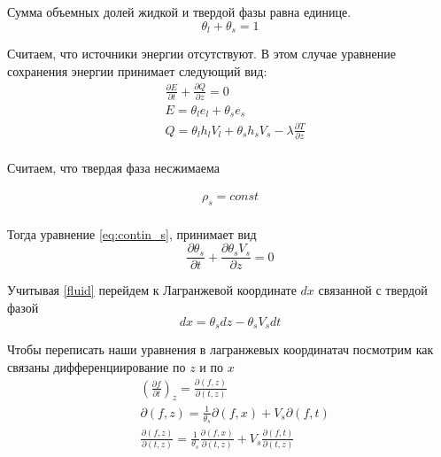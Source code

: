\documentclass[12pt,a4paper]{article}
\newcommand{\pd}[2]{\frac{\partial #1}{\partial #2}}
\begin{document}
Сумма объемных долей жидкой и твердой фазы равна единице.
\begin{equation}
\theta_l + \theta_s = 1
\label{eq:satur}
\end{equation}

Считаем, что источники энергии отсутствуют. В этом случае уравнение сохранения энергии принимает следующий вид:
\begin{equation}
\begin{aligned}
&\pd{E}{t} + \pd{Q}{z} =0 \\
&E=\theta_l e_l + \theta_s e_s \\
&Q=\theta_l h_l V_l + \theta_s h_s V_s - \lambda \pd{T}{z}\\
\label{eq:conserv}
\end{aligned}
\end{equation}

Считаем, что твердая фаза несжимаема

\begin{equation}
\begin{aligned}
\rho_s = const \\
\label{rho_const}
\end{aligned}
\end{equation}

Тогда уравнение \eqref{eq:contin_s}, принимает вид
\begin{equation}
\pd{\theta_s}{t} + \pd{\theta_s V_s}{z} = 0
\label{fluid}
\end{equation}

Учитывая \eqref{fluid} перейдем к Лагранжевой координате $dx$ связанной с твердой фазой
\begin{equation}
dx = \theta_s dz - \theta_s V_s dt
\label{dx_dz}
\end{equation}

Чтобы переписать наши уравнения в лагранжевых координатач посмотрим как связаны дифференциирование по $ z $ и по $ x $
\begin{equation}
\begin{aligned}
&\left(\pd{f}{t}\right)_z = \pd{(f , z)}{(t , z)}\\
&\partial(f , z) = \frac{1}{\theta_s}\partial(f , x) + V_s \partial(f , t)\\
&\pd{(f , z)}{(t , z)} = \frac{1}{\theta_s}\pd{(f , x)}{(t , z)} + V_s\pd{(f , t)}{(t , z)}\\
\end{aligned}
\label{help1}
\end{equation}
\end{document}
